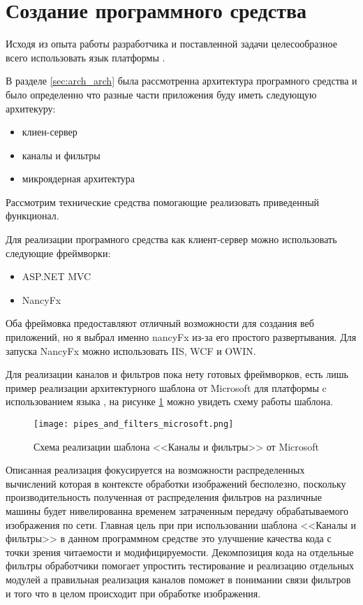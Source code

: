 \section{Создание программного средства}
\label{sec:creation}

Исходя из опыта работы разработчика и поставленной задачи целесообразное всего использовать язык \csharp{} платформы \dotnet{}.

В разделе \ref{sec:arch_arch} была рассмотренна архитектура програмного средства и было определенно что разные части приложения буду иметь следующую архитекуру:
\begin{itemize}
	\item клиен-сервер
	\item каналы и фильтры
	\item микроядерная архитектура
\end{itemize}
Рассмотрим технические средства помогающие реализовать приведенный функционал.

Для реализации програмного средства как клиент-сервер можно использовать следующие фреймворки:
\begin{itemize}
	\item ASP.NET MVC
	\item NancyFx
\end{itemize}
Оба фреймовка предоставляют отличный возможности для создания веб приложений, но я выбрал именно nancyFx из-за его простого развертывания. Для запуска NancyFx можно использовать IIS, WCF и OWIN.

Для реализации каналов и фильтров пока нету готовых фреймворков, есть лишь пример реализации архитектурного шаблона от Microsoft для платформы c использованием языка \csharp{} \cite{pipes_and_filters_pattern}, на рисунке \ref{fig:creation:pipes_and_filters_microsoft} можно увидеть схему работы шаблона.

\begin{figure}[ht] 
    \centering
    \texttt{[image: pipes\_and\_filters\_microsoft.png]}  
    \caption{Схема реализации шаблона <<Каналы и фильтры>> от Microsoft}
    \label{fig:creation:pipes_and_filters_microsoft}
\end{figure}

Описанная реализация фокусируется на возможности распределенных вычислений которая в контексте обработки изображений бесполезно, поскольку производительность полученная от распределения фильтров на различные машины будет нивелированна временем затраченным передачу обрабатываемого изображения по сети. Главная цель при при использовании шаблона <<Каналы и фильтры>> в данном программном средстве это улучшение качества кода с точки зрения читаемости и модифицируемости. Декомпозиция кода на отдельные фильтры обработчики помогает упростить тестирование и реализацию отдельных модулей а правильная реализация каналов поможет в понимании связи фильтров и того что в целом происходит при обработке изображения. 

